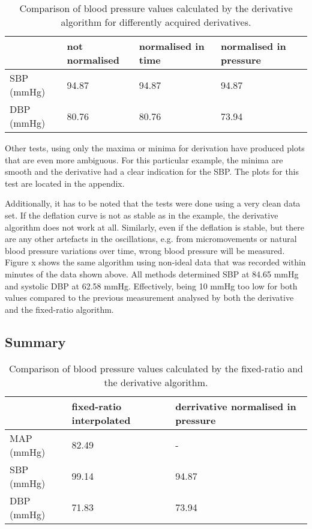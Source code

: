 \begin{table}[]\label{tbl:derComp}
\centering
\begin{tabular}{llll}
\hline
           & not normalised & normalised in time & normalised in pressure \\ \hline
SBP (mmHg) & 94.87          & 94.87              & 94.87                  \\ \hline
DBP (mmHg) & 80.76          & 80.76              & 73.94                  \\ \hline
\end{tabular}
\caption{Comparison of blood pressure values calculated by the derivative algorithm for differently acquired derivatives.}
\end{table}


Other tests, using only the maxima or minima for derivation have produced plots that are even more ambiguous. For this particular example, the minima are smooth and the derivative had a clear indication for the SBP. The plots for this test are located in the appendix.

Additionally, it has to be noted that the tests were done using a very clean data set. If the deflation curve is not as stable as in the example, the derivative algorithm does not work at all. Similarly, even if the deflation is stable, but there are any other artefacts in the oscillations, e.g. from micromovements or natural blood pressure variations over time, wrong blood pressure will be measured. Figure x shows the same algorithm using non-ideal data that was recorded within minutes of the data shown above. All methods determined  SBP at 84.65 mmHg and systolic DBP at 62.58 mmHg. Effectively, being 10 mmHg too low for both values compared to the previous measurement analysed by both the derivative and the fixed-ratio algorithm. 



\subsection{Summary}

\begin{table}[]\label{tbl:sumPy}
\centering
\begin{tabular}{lll}
\hline
           & fixed-ratio interpolated & derrivative normalised in pressure\\ \hline
MAP (mmHg) & 82.49       & -           \\ \hline
SBP (mmHg) & 99.14       & 94.87       \\ \hline
DBP (mmHg) & 71.83       & 73.94       \\ \hline
\end{tabular}
\caption{Comparison of blood pressure values calculated by the fixed-ratio and the derivative algorithm.}
\end{table}


